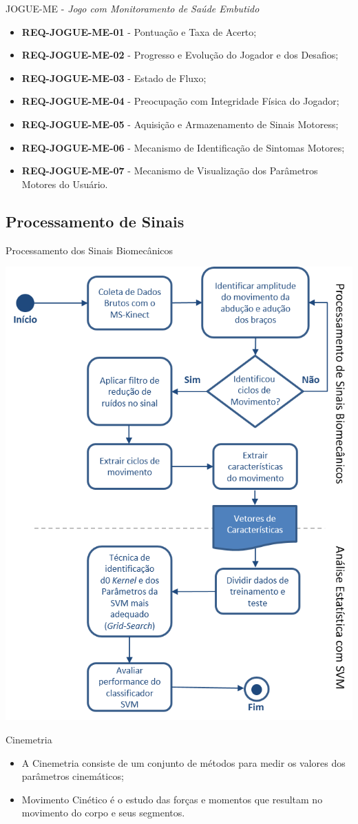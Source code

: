 \documentclass{beamer}
\begin{document}
\begin{frame}{JOGUE-ME - \textit{Jogo com Monitoramento de Saúde Embutido}}
	\begin{block}{}
		\begin{itemize}[<+->]
			\item	\textbf{REQ-JOGUE-ME-01} - Pontuação e Taxa de Acerto;
			\item	\textbf{REQ-JOGUE-ME-02} - Progresso e Evolução do Jogador e dos Desafios;
			\item	\textbf{REQ-JOGUE-ME-03} - Estado de Fluxo;
			\item	\textbf{REQ-JOGUE-ME-04} - Preocupação com Integridade Física do Jogador;
			\item	\textbf{REQ-JOGUE-ME-05} - Aquisição e Armazenamento de Sinais Motoress;
			\item	\textbf{REQ-JOGUE-ME-06} - Mecanismo de Identificação de Sintomas Motores;
			\item	\textbf{REQ-JOGUE-ME-07} - Mecanismo de Visualização dos Parâmetros Motores do Usuário.
		\end{itemize}
	\end{block}
\end{frame}

\subsection{Processamento de Sinais}
\begin{frame}{Processamento dos Sinais Biomecânicos}
  \begin{block}{}
      \center \includegraphics[height=2.4 in]{img/biomecprocessor2.png}
  \end{block}
\end{frame}


\begin{frame}{Cinemetria}
  \begin{block}{}
      \begin{itemize}[<+->]
	 \item A Cinemetria consiste de um conjunto de métodos para medir os valores dos parâmetros cinemáticos;
	 \item Movimento Cinético é o estudo das forças e momentos que resultam no movimento do corpo e seus segmentos.
       \end{itemize}
  \end{block}
\end{frame}
\end{document}
